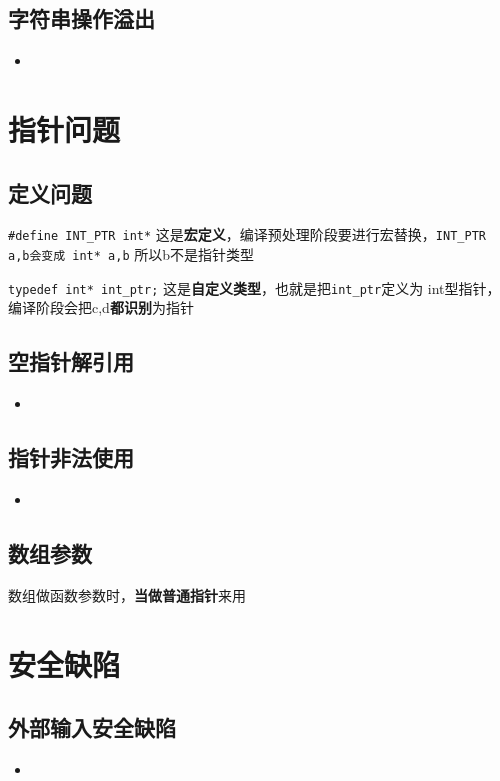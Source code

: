 \documentclass[UTF8,a4paper,12pt]{ctexbook} %
\begin{document}
		\subsection{字符串操作溢出}
			\begin{itemize}
				\item 
			\end{itemize}

\section{指针问题}
		\subsection{定义问题}
			\verb|#define INT_PTR int*| 这是\textbf{宏定义}，编译预处理阶段要进行宏替换，\verb|INT_PTR a,b会变成 int* a,b| 所以b不是指针类型
			
			\verb|typedef int* int_ptr;| 这是\textbf{自定义类型}，也就是把\verb|int_ptr|定义为 int型指针，编译阶段会把c,d\textbf{都识别}为指针
			
		\subsection{空指针解引用}
			\begin{itemize}
				\item 
			\end{itemize}
		\subsection{指针非法使用}
			\begin{itemize}
				\item 
			\end{itemize}
			
		\subsection{数组参数}
			数组做函数参数时，\textbf{当做普通指针}来用
			
\section{安全缺陷}
		\subsection{外部输入安全缺陷}
			\begin{itemize}
				\item 
			\end{itemize}
\end{document}
